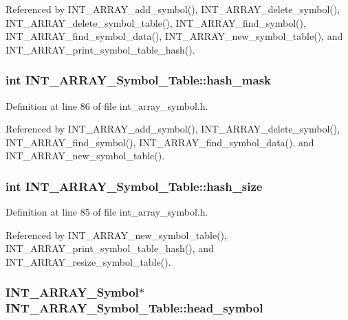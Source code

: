 Referenced by INT\_\-ARRAY\_\-add\_\-symbol(), INT\_\-ARRAY\_\-delete\_\-symbol(), INT\_\-ARRAY\_\-delete\_\-symbol\_\-table(), INT\_\-ARRAY\_\-find\_\-symbol(), INT\_\-ARRAY\_\-find\_\-symbol\_\-data(), INT\_\-ARRAY\_\-new\_\-symbol\_\-table(), and INT\_\-ARRAY\_\-print\_\-symbol\_\-table\_\-hash().
\subsubsection{\setlength{\rightskip}{0pt plus 5cm}int \bf{INT\_\-ARRAY\_\-Symbol\_\-Table::hash\_\-mask}}\label{structINT__ARRAY__Symbol__Table_7e6e4678eeb29f737df4e23bd09e989e}




Definition at line 86 of file int\_\-array\_\-symbol.h.

Referenced by INT\_\-ARRAY\_\-add\_\-symbol(), INT\_\-ARRAY\_\-delete\_\-symbol(), INT\_\-ARRAY\_\-find\_\-symbol(), INT\_\-ARRAY\_\-find\_\-symbol\_\-data(), and INT\_\-ARRAY\_\-new\_\-symbol\_\-table().
\subsubsection{\setlength{\rightskip}{0pt plus 5cm}int \bf{INT\_\-ARRAY\_\-Symbol\_\-Table::hash\_\-size}}\label{structINT__ARRAY__Symbol__Table_5f4b374c96020f6aa7ad578fa1b0ee49}




Definition at line 85 of file int\_\-array\_\-symbol.h.

Referenced by INT\_\-ARRAY\_\-new\_\-symbol\_\-table(), INT\_\-ARRAY\_\-print\_\-symbol\_\-table\_\-hash(), and INT\_\-ARRAY\_\-resize\_\-symbol\_\-table().
\subsubsection{\setlength{\rightskip}{0pt plus 5cm}\bf{INT\_\-ARRAY\_\-Symbol}$\ast$ \bf{INT\_\-ARRAY\_\-Symbol\_\-Table::head\_\-symbol}}\label{structINT__ARRAY__Symbol__Table_0c0d416fdf534ec41db2782d889ca520}





